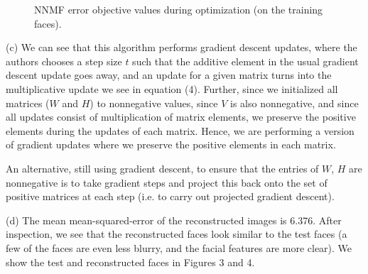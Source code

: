 \begin{figure}[h!tbp]
        \caption{NNMF error objective values during optimization (on the
        training faces).}
\end{figure}

(c) We can see that this algorithm performs gradient descent updates, where the
authors chooses a step size $t$ such that the additive element in the usual
gradient descent update goes away, and an update for a given matrix turns into
the multiplicative update we see in equation (4). Further, since we initialized
all matrices ($W$ and $H$) to nonnegative values, since $V$ is also
nonnegative, and since all updates consist of multiplication of matrix
elements, we preserve the positive elements during the updates of each matrix.
Hence, we are performing a version of gradient updates where we preserve the
positive elements in each matrix.

An alternative, still using gradient descent, to ensure that the entries of
$W$, $H$ are nonnegative is to take gradient steps and project this back onto
the set of positive matrices at each step (i.e. to carry out projected gradient
descent).

(d) The mean mean-squared-error of the reconstructed images is 6.376.  After
inspection, we see that the reconstructed faces look similar to the test faces
(a few of the faces are even less blurry, and the facial features are more
clear). We show the test and reconstructed faces in Figures 3 and 4.

